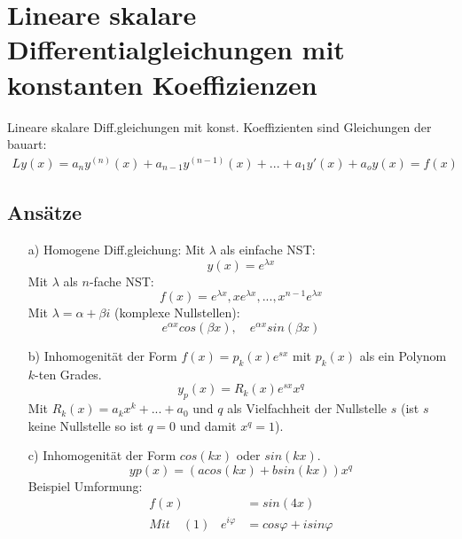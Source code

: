     \section{Lineare skalare Differentialgleichungen mit konstanten Koeffizienzen}
  \begin{definition}
    Lineare skalare Diff.gleichungen mit konst. Koeffizienten sind Gleichungen der bauart:
    \begin{align*}
      Ly(x) = a_n y^{(n)}(x)+a_{n-1}y^{(n-1)}(x)+...+a_1y'(x) + a_o y(x) = f(x)
    \end{align*}
  \end{definition}
  \subsection{Ansätze}
  \begin{itemize}
    \item[a)] Homogene Diff.gleichung:
    Mit $\lambda$ als einfache NST:
    \begin{equation}
      y(x) = e^{\displaystyle\lambda x} \label{eq:dgl_Ansatz_a}
    \end{equation}
    Mit $\lambda$ als $n$-fache NST:
    \begin{equation}
      f(x) = e^{\displaystyle\lambda x}, xe^{\displaystyle\lambda x}, ..., x^{n-1}e^{\displaystyle\lambda x} 
    \end{equation}
    Mit $\lambda = \alpha + \beta i$ (komplexe Nullstellen):
    \begin{equation}
      e^{\alpha x}cos(\beta x),\quad e^{\alpha x} sin(\beta x)
    \end{equation}
    \item[b)] Inhomogenität der Form $f(x) = p_k(x) e^{sx}$ mit $p_k(x)$ als ein Polynom $k$-ten Grades.
    \begin{equation}
      y_p(x) = R_k(x)e^{sx}x^q
    \end{equation}
    Mit $R_k(x) = a_kx^k+...+a_0$ und $q$ als Vielfachheit der Nullstelle $s$ (ist $s$ keine Nullstelle so ist $q = 0$ und damit $x^q = 1$).
    \item[c)] Inhomogenität der Form $cos(kx)$ oder $sin(kx)$.
    \begin{equation}
      yp(x) = (a cos(kx) + b sin(kx)) x^q
    \end{equation}
    Beispiel Umformung:
    \begin{align}
      f(x) &= sin(4x)\nonumber\\
      Mit \quad
      (1)\;\;\; e^{i\varphi} &= cos \varphi + i sin\varphi\nonumber \\

\end{align}
\end{itemize}
